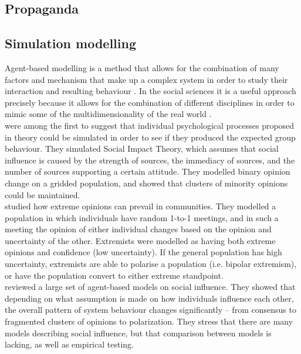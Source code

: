 \subsection{Propaganda} 

\subsection{Simulation modelling}
Agent-based modelling is a method that allows for the combination of many factors and mechanism that make up a complex system in order to study their interaction and resulting behaviour \citep{Flache2017}.  In the social sciences it is a useful approach precisely because it allows for the combination of different disciplines in order to mimic some of the multidimensionality of the real world \citep{Epstein2006}. \\

\cite{Nowak1990} were among the first to suggest that individual psychological processes proposed in theory could be simulated in order to see if they produced the expected group behaviour. They simulated Social Impact Theory, which assumes that social influence is caused by the strength of sources, the immediacy of sources, and the number of sources supporting a certain attitude. They modelled binary opinion change on a gridded population, and showed that clusters of minority opinions could be maintained. \\

\cite{Deffuant2002} studied how extreme opinions can prevail in communities. They modelled a population in which individuals have random 1-to-1 meetings, and in such a meeting the opinion of either individual changes based on the opinion and uncertainty of the other. Extremists were modelled as having both extreme opinions and confidence (low uncertainty). If the general population has high uncertainty, extremists are able to polarise a population (i.e. bipolar extremism), or have the population convert to either extreme standpoint. \\

\cite{Flache2017} reviewed a large set of agent-based models on social influence. They showed that depending on what assumption is made on how individuals influence each other, the overall pattern of system behaviour changes significantly – from consensus to fragmented clusters of opinions to polarization. They stress that there are many models describing social influence, but that comparison between models is lacking, as well as empirical testing. \\

